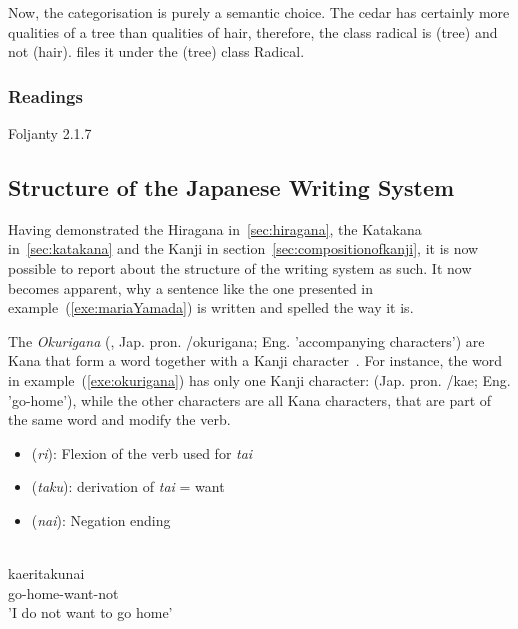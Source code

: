 Now, the categorisation is purely a semantic choice. The cedar has certainly more
qualities of a tree than qualities of hair, therefore, the class radical is
 (tree) and not  (hair).  files it 
under the  (tree) class Radical. %


\subsubsection{Readings}
\label{sec:readings}
Foljanty 2.1.7

\subsection{Structure of the Japanese Writing System}
\label{sec:structureofwritingsystem}
Having demonstrated the Hiragana in~\ref{sec:hiragana}, the Katakana 
in~\ref{sec:katakana} and the Kanji in section~\ref{sec:compositionofkanji}, 
it is now possible to report about the structure of the writing system as such.
It now becomes apparent, why a sentence like the one presented in 
example~(\ref{exe:mariaYamada}) is written and spelled the way it is.

The \emph{Okurigana} (, Jap. pron. /okurigana; 
Eng. 'accompanying characters') are Kana that form 
a word together with a Kanji character~.
For instance, the word in example~(\ref{exe:okurigana}) has only one Kanji 
character:  (Jap. pron. /kae; Eng. 'go-home'), while the other characters are all Kana characters, that are part of the same word and modify
the verb.
\begin{itemize}
  \item {} (\emph{ri}): Flexion of the verb used for \emph{tai}
  \item {} (\emph{taku}): derivation of \emph{tai} = want
  \item {} (\emph{nai}): Negation ending
\end{itemize}

\begin{exe}
\ex\label{exe:okurigana}
\gll 
  \\
 kaeritakunai \\
 go-home-want-not \\
\trans 'I do not want to go home' \\
\end{exe}


